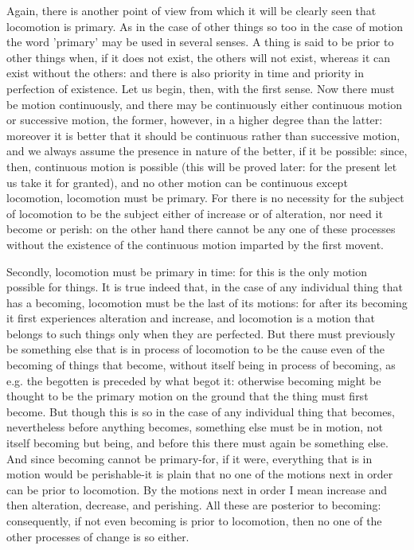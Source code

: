 Again, there is another point of view from which it will be clearly
seen that locomotion is primary. As in the case of other things so
too in the case of motion the word 'primary' may be used in several
senses. A thing is said to be prior to other things when, if it does
not exist, the others will not exist, whereas it can exist without
the others: and there is also priority in time and priority in perfection
of existence. Let us begin, then, with the first sense. Now there
must be motion continuously, and there may be continuously either
continuous motion or successive motion, the former, however, in a
higher degree than the latter: moreover it is better that it should
be continuous rather than successive motion, and we always assume
the presence in nature of the better, if it be possible: since, then,
continuous motion is possible (this will be proved later: for the
present let us take it for granted), and no other motion can be continuous
except locomotion, locomotion must be primary. For there is no necessity
for the subject of locomotion to be the subject either of increase
or of alteration, nor need it become or perish: on the other hand
there cannot be any one of these processes without the existence of
the continuous motion imparted by the first movent. 

Secondly, locomotion must be primary in time: for this is the only
motion possible for things. It is true indeed that, in the case of
any individual thing that has a becoming, locomotion must be the last
of its motions: for after its becoming it first experiences alteration
and increase, and locomotion is a motion that belongs to such things
only when they are perfected. But there must previously be something
else that is in process of locomotion to be the cause even of the
becoming of things that become, without itself being in process of
becoming, as e.g. the begotten is preceded by what begot it: otherwise
becoming might be thought to be the primary motion on the ground that
the thing must first become. But though this is so in the case of
any individual thing that becomes, nevertheless before anything becomes,
something else must be in motion, not itself becoming but being, and
before this there must again be something else. And since becoming
cannot be primary-for, if it were, everything that is in motion would
be perishable-it is plain that no one of the motions next in order
can be prior to locomotion. By the motions next in order I mean increase
and then alteration, decrease, and perishing. All these are posterior
to becoming: consequently, if not even becoming is prior to locomotion,
then no one of the other processes of change is so either.

